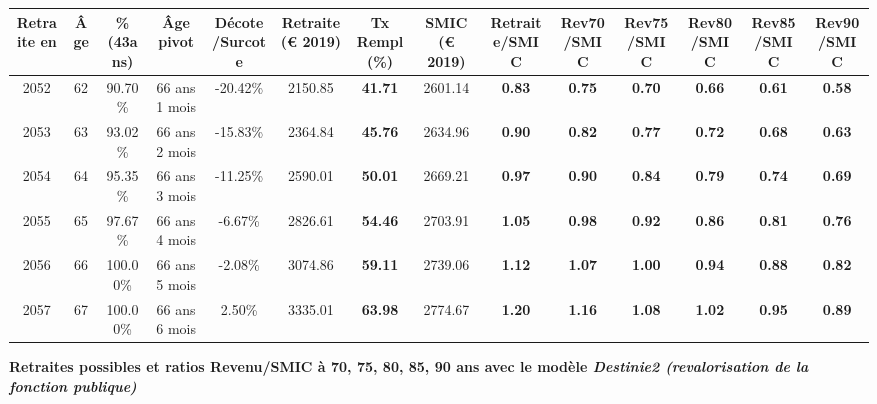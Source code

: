 \begin{adjustbox}{max width=\textwidth} 
\begin{tabular}[htb]{|c|c||c|c|c||c|c||c||c|c|c|c|c|c|} 
\hline 
 Retraite en &  Âge &  \%(43ans) &  Âge pivot &  Décote/Surcote &  Retraite (\euro{} 2019) &  Tx Rempl(\%) &  SMIC (\euro{} 2019) &  Retraite/SMIC &  Rev70/SMIC &  Rev75/SMIC &  Rev80/SMIC &  Rev85/SMIC &  Rev90/SMIC \\ 
\hline \hline 
 2052 &  62 &  90.70\% &  66 ans 1 mois &  -20.42\% &  2150.85 &  {\bf 41.71} &  2601.14 &  {\bf {\color{red} 0.83}} &  {\bf {\color{red} 0.75}} &  {\bf {\color{red} 0.70}} &  {\bf {\color{red} 0.66}} &  {\bf {\color{red} 0.61}} &  {\bf {\color{red} 0.58}} \\ 
\hline 
 2053 &  63 &  93.02\% &  66 ans 2 mois &  -15.83\% &  2364.84 &  {\bf 45.76} &  2634.96 &  {\bf {\color{red} 0.90}} &  {\bf {\color{red} 0.82}} &  {\bf {\color{red} 0.77}} &  {\bf {\color{red} 0.72}} &  {\bf {\color{red} 0.68}} &  {\bf {\color{red} 0.63}} \\ 
\hline 
 2054 &  64 &  95.35\% &  66 ans 3 mois &  -11.25\% &  2590.01 &  {\bf 50.01} &  2669.21 &  {\bf {\color{red} 0.97}} &  {\bf {\color{red} 0.90}} &  {\bf {\color{red} 0.84}} &  {\bf {\color{red} 0.79}} &  {\bf {\color{red} 0.74}} &  {\bf {\color{red} 0.69}} \\ 
\hline 
 2055 &  65 &  97.67\% &  66 ans 4 mois &  -6.67\% &  2826.61 &  {\bf 54.46} &  2703.91 &  {\bf 1.05} &  {\bf {\color{red} 0.98}} &  {\bf {\color{red} 0.92}} &  {\bf {\color{red} 0.86}} &  {\bf {\color{red} 0.81}} &  {\bf {\color{red} 0.76}} \\ 
\hline 
 2056 &  66 &  100.00\% &  66 ans 5 mois &  -2.08\% &  3074.86 &  {\bf 59.11} &  2739.06 &  {\bf 1.12} &  {\bf 1.07} &  {\bf {\color{red} 1.00}} &  {\bf {\color{red} 0.94}} &  {\bf {\color{red} 0.88}} &  {\bf {\color{red} 0.82}} \\ 
\hline 
 2057 &  67 &  100.00\% &  66 ans 6 mois &  2.50\% &  3335.01 &  {\bf 63.98} &  2774.67 &  {\bf 1.20} &  {\bf 1.16} &  {\bf 1.08} &  {\bf 1.02} &  {\bf {\color{red} 0.95}} &  {\bf {\color{red} 0.89}} \\ 
\hline 
\hline 
\end{tabular} 
\end{adjustbox} 
 
 \vspace{0.1cm} 
{\bf \noindent Retraites possibles et ratios Revenu/SMIC à 70, 75, 80, 85, 90 ans avec le modèle \emph{Destinie2 (revalorisation de la fonction publique)}}  
 
